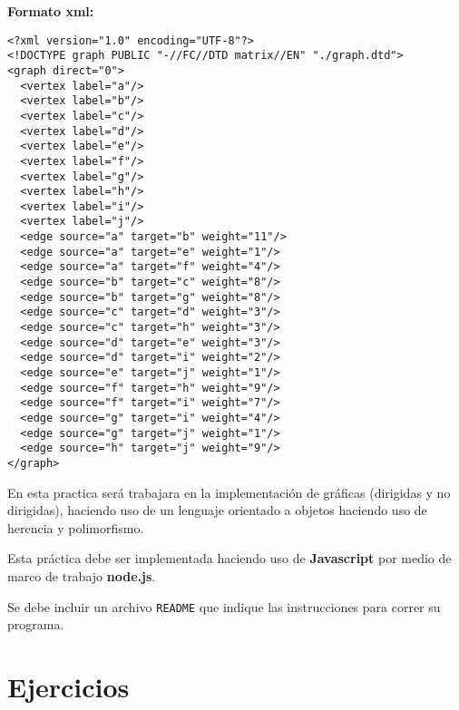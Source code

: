 \documentclass{article}
\begin{document}
\textbf{Formato xml:}
\begin{verbatim}
<?xml version="1.0" encoding="UTF-8"?>
<!DOCTYPE graph PUBLIC "-//FC//DTD matrix//EN" "./graph.dtd">
<graph direct="0">
  <vertex label="a"/>
  <vertex label="b"/>	
  <vertex label="c"/>
  <vertex label="d"/>
  <vertex label="e"/>
  <vertex label="f"/>
  <vertex label="g"/>
  <vertex label="h"/>
  <vertex label="i"/>
  <vertex label="j"/>
  <edge source="a" target="b" weight="11"/>
  <edge source="a" target="e" weight="1"/>
  <edge source="a" target="f" weight="4"/>
  <edge source="b" target="c" weight="8"/>
  <edge source="b" target="g" weight="8"/>
  <edge source="c" target="d" weight="3"/>
  <edge source="c" target="h" weight="3"/>
  <edge source="d" target="e" weight="3"/>
  <edge source="d" target="i" weight="2"/>
  <edge source="e" target="j" weight="1"/>
  <edge source="f" target="h" weight="9"/>
  <edge source="f" target="i" weight="7"/>
  <edge source="g" target="i" weight="4"/>
  <edge source="g" target="j" weight="1"/>
  <edge source="h" target="j" weight="9"/>
</graph>
\end{verbatim}

En esta practica será trabajara en la implementación de gráficas (dirigidas y no dirigidas), haciendo uso de un lenguaje orientado a objetos haciendo uso de herencia y polimorfismo.

Esta práctica debe ser implementada haciendo uso de \textbf{Javascript} por medio
de marco de trabajo \textbf{node.js}.

Se debe incluir un archivo \texttt{README} que indique las instrucciones para correr su programa.

\section{Ejercicios}
\end{document}
